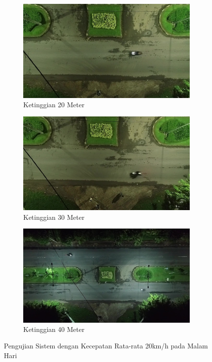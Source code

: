 \begin{figure}[H]
  \centering
  \begin{subfigure}[b]{0.3\textwidth}
    \centering
    \includegraphics[width=\linewidth]{bab4/20m_malam_20km.jpg}
    \caption{Ketinggian 20 Meter}
    \label{fig:20m_malam_20kmh}
  \end{subfigure}%
  \hfill
  \begin{subfigure}[b]{0.3\textwidth}
    \centering
    \includegraphics[width=\linewidth]{bab4/30m_malam_20km.jpg}
    \caption{Ketinggian 30 Meter}
    \label{fig:30m_malam_20kmh}
  \end{subfigure}%
  \hfill
  \begin{subfigure}[b]{0.3\textwidth}
    \centering
    \includegraphics[width=\linewidth]{bab4/40m_malam_20km.jpg}
    \caption{Ketinggian 40 Meter}
    \label{fig:40m_malam_20kmh}
  \end{subfigure}
  \caption{Pengujian Sistem dengan Kecepatan Rata-rata 20km/h pada Malam Hari}
  \label{fig:ujimalam_20kmh}
\end{figure}

